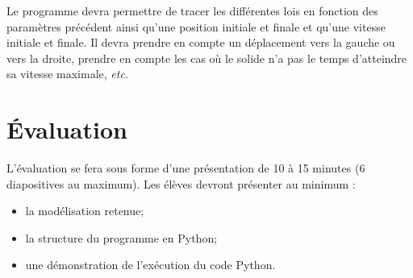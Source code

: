\documentclass[10pt,fleqn]{article} %
\begin{document}
\begin{multicols}{2}
Le programme devra permettre de tracer les différentes lois en fonction des paramètres précédent ainsi qu'une position initiale et finale et qu'une vitesse initiale et finale. Il devra prendre en compte un déplacement vers la gauche ou vers la droite, prendre en compte les cas où le solide n'a pas le temps d'atteindre sa vitesse maximale, \textit{etc.}




\section{Évaluation}
L'évaluation se fera sous forme d'une présentation de 10 à 15 minutes (6 diapositives au maximum). Les élèves devront présenter au minimum : 
\begin{itemize}
\item la modélisation retenue;
\item la structure du programme en Python;
\item une démonstration de l'exécution du code Python.
\end{itemize}




\end{multicols}
\end{document}
